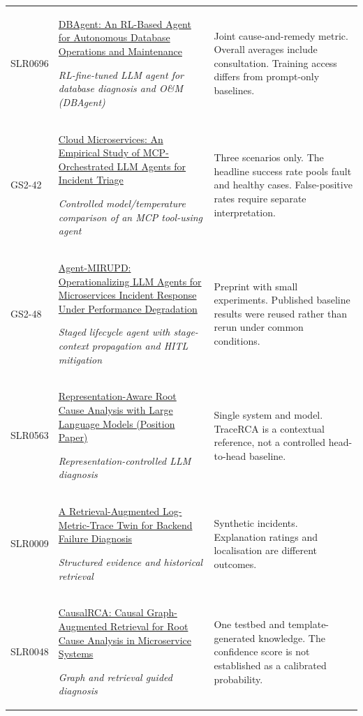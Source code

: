 \begin{longtable}{@{}p{}p{}p{}@{}}
SLR0696 & \href{https://www.vldb.org/pvldb/vol19/p3928-chen.pdf}{DBAgent: An RL-Based Agent for Autonomous Database Operations and Maintenance}\par\emph{RL-fine-tuned LLM agent for database diagnosis and O\&M (DBAgent)} & Joint cause-and-remedy metric. Overall averages include consultation. Training access differs from prompt-only baselines. \\
GS2-42 & \href{https://sol.sbc.org.br/index.php/semish/article/download/43509/43272}{Cloud Microservices: An Empirical Study of MCP-Orchestrated LLM Agents for Incident Triage}\par\emph{Controlled model/temperature comparison of an MCP tool-using agent} & Three scenarios only. The headline success rate pools fault and healthy cases. False-positive rates require separate interpretation. \\
GS2-48 & \href{https://assets-eu.researchsquare.com/files/rs-10499343/v1_covered_585c57a7-39b6-4e04-a86f-bdcf416ada4e.pdf?c=1790145669}{Agent-MIRUPD: Operationalizing LLM Agents for Microservices Incident Response Under Performance Degradation}\par\emph{Staged lifecycle agent with stage-context propagation and HITL mitigation} & Preprint with small experiments. Published baseline results were reused rather than rerun under common conditions. \\
SLR0563 & \href{https://www.researchgate.net/publication/402677372_Representation-Aware_Root_Cause_Analysis_with_Large_Language_Models_Position_Paper}{Representation-Aware Root Cause Analysis with Large Language Models (Position Paper)}\par\emph{Representation-controlled LLM diagnosis} & Single system and model. TraceRCA is a contextual reference, not a controlled head-to-head baseline. \\
SLR0009 & \href{https://www.researchgate.net/publication/407161871_A_Retrieval-Augmented_Log-Metric-Trace_Twin_for_Backend_Failure_Diagnosis}{A Retrieval-Augmented Log-Metric-Trace Twin for Backend Failure Diagnosis}\par\emph{Structured evidence and historical retrieval} & Synthetic incidents. Explanation ratings and localisation are different outcomes. \\
SLR0048 & \href{https://www.researchgate.net/publication/404197467_CausalRCA_Causal_Graph-Augmented_Retrieval_for_Root_Cause_Analysis_in_Microservice_Systems}{CausalRCA: Causal Graph-Augmented Retrieval for Root Cause Analysis in Microservice Systems}\par\emph{Graph and retrieval guided diagnosis} & One testbed and template-generated knowledge. The confidence score is not established as a calibrated probability. \\

\end{longtable}
